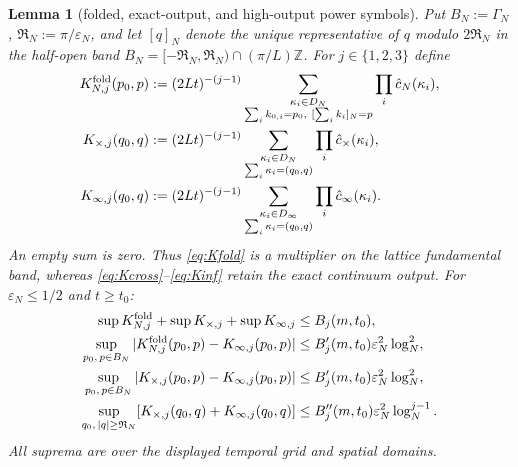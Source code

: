 \documentclass[11pt,a4paper]{article}
\theoremstyle{plain}
\newtheorem{lemma}[theorem]{Lemma}
\theoremstyle{definition}
\newcommand{\Z}{\mathbb{Z}}
\newcommand{\eps}{\varepsilon}
\begin{document}
\begin{lemma}[folded, exact-output, and high-output power symbols]
\label{lem:symbolsup}
Put $B_N:=\Gamma_N$, $\mathfrak R_N:=\pi/\eps_N$, and let $[q]_N$ denote
the unique representative of $q$ modulo $2\mathfrak R_N$ in the half-open band
$B_N=[-\mathfrak R_N,\mathfrak R_N)\cap(\pi/L)\Z$.  For $j\in\{1,2,3\}$ define
\begin{align}
 K_{N,j}^{\rm fold}(p_0,p)
 &:=(2Lt)^{-(j-1)}
 \sum_{\substack{\kappa_i\in D_N\\
       \sum_i k_{0,i}=p_0,\ [\sum_i k_i]_N=p}}
       \prod_i\hat c_N(\kappa_i),                                      \label{eq:Kfold}\\
 K_{\times,j}(q_0,q)
 &:=(2Lt)^{-(j-1)}
 \sum_{\substack{\kappa_i\in D_N\\\sum_i\kappa_i=(q_0,q)}}
       \prod_i\hat c_\times(\kappa_i),                                \label{eq:Kcross}\\
 K_{\infty,j}(q_0,q)
 &:=(2Lt)^{-(j-1)}
 \sum_{\substack{\kappa_i\in D_\infty\\\sum_i\kappa_i=(q_0,q)}}
       \prod_i\hat c_\infty(\kappa_i).                                \label{eq:Kinf}
\end{align}
An empty sum is zero.  Thus \eqref{eq:Kfold} is a multiplier on the lattice
fundamental band, whereas \eqref{eq:Kcross}--\eqref{eq:Kinf} retain the exact
continuum output.  For $\eps_N\le1/2$ and $t\ge t_0$:
\begin{align}
 \sup K_{N,j}^{\rm fold}+\sup K_{\times,j}+\sup K_{\infty,j}
 &\le B_j(m,t_0),                                                       \label{eq:Ksup}\\
 \sup_{p_0,\,p\in B_N}
 |K_{N,j}^{\rm fold}(p_0,p)-K_{\infty,j}(p_0,p)|
 &\le B_j'(m,t_0)\eps_N^2\log_N^2,                                    \label{eq:Kfolddiff}\\
 \sup_{p_0,\,p\in B_N}
 |K_{\times,j}(p_0,p)-K_{\infty,j}(p_0,p)|
 &\le B_j'(m,t_0)\eps_N^2\log_N^2,                                    \label{eq:Kcrossdiff}\\
 \sup_{q_0,\,|q|\ge\mathfrak R_N}
 [K_{\times,j}(q_0,q)+K_{\infty,j}(q_0,q)]
 &\le B_j''(m,t_0)\eps_N^2\log_N^{j-1}.                               \label{eq:Khigh}
\end{align}
All suprema are over the displayed temporal grid and spatial domains.
\end{lemma}
\end{document}

